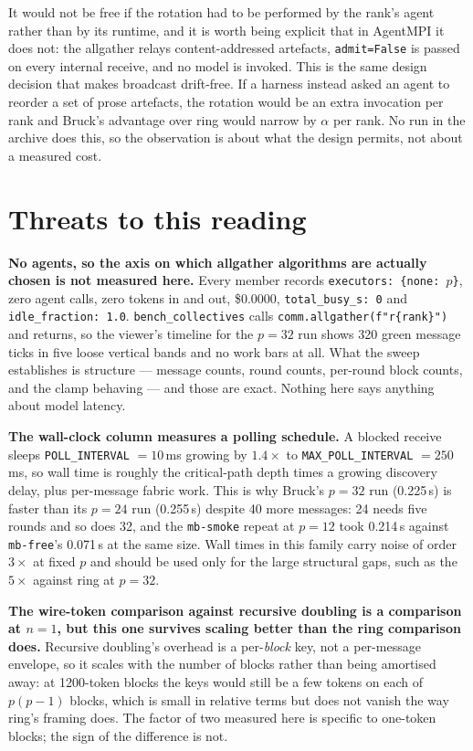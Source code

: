 \documentclass[11pt]{article}
\begin{document}
It would not be free if the rotation had to be performed by the rank's agent rather than by its
runtime, and it is worth being explicit that in AgentMPI it does not: the allgather relays
content-addressed artefacts, \texttt{admit=False} is passed on every internal receive, and no
model is invoked. This is the same design decision that makes broadcast drift-free. If a harness
instead asked an agent to reorder a set of prose artefacts, the rotation would be an extra
invocation per rank and Bruck's advantage over ring would narrow by $\alpha$ per rank. No run in
the archive does this, so the observation is about what the design permits, not about a measured
cost.

\section{Threats to this reading}

\textbf{No agents, so the axis on which allgather algorithms are actually chosen is not measured
here.} Every member records \texttt{executors: \{none: $p$\}}, zero agent calls, zero tokens in
and out, \$0.0000, \texttt{total\_busy\_s: 0} and \texttt{idle\_fraction: 1.0}.
\texttt{bench\_collectives} calls \texttt{comm.allgather(f"r\{rank\}")} and returns, so the
viewer's timeline for the $p=32$ run shows 320 green message ticks in five loose vertical bands
and no work bars at all. What the sweep establishes is
structure --- message counts, round counts, per-round block counts, and the clamp behaving --- and
those are exact. Nothing here says anything about model latency.

\textbf{The wall-clock column measures a polling schedule.} A blocked receive sleeps
\texttt{POLL\_INTERVAL} $= 10$\,ms growing by $1.4\times$ to \texttt{MAX\_POLL\_INTERVAL} $=
250$\,ms, so wall time is roughly the critical-path depth times a growing discovery delay, plus
per-message fabric work. This is why Bruck's $p=32$ run (0.225\,s) is faster than its $p=24$ run
(0.255\,s) despite 40 more messages: 24 needs five rounds and so does 32, and the
\texttt{mb-smoke} repeat at $p=12$ took 0.214\,s against \texttt{mb-free}'s 0.071\,s at the same
size. Wall times in this family carry noise of order $3\times$ at fixed $p$ and should be used
only for the large structural gaps, such as the $5\times$ against ring at $p=32$.

\textbf{The wire-token comparison against recursive doubling is a comparison at $n=1$, but this
one survives scaling better than the ring comparison does.} Recursive doubling's overhead is a
per-\emph{block} key, not a per-message envelope, so it scales with the number of blocks rather
than being amortised away: at 1200-token blocks the keys would still be a few tokens on each of
$p(p-1)$ blocks, which is small in relative terms but does not vanish the way ring's framing does.
The factor of two measured here is specific to one-token blocks; the sign of the difference is
not.
\end{document}

